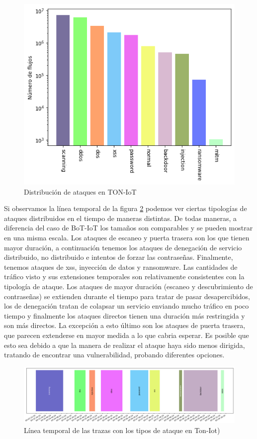 \begin{figure}[H]
  \begin{center}
      \includegraphics[width=0.49\linewidth]{media/toniot_csv_results.png}
  \end{center}
  \captionsetup{justification=centering}
  \caption{Distribución de ataques en TON-IoT}\label{fig:toniot_results}
\end{figure}

Si observamos la línea temporal de la figura \ref{fig:toniot_timeline} podemos ver ciertas tipologías de ataques distribuidos en el tiempo de maneras distintas. De todas maneras, a diferencia del caso de BoT-IoT los tamaños son comparables y se pueden mostrar en una misma escala. Los ataques de escaneo y puerta trasera son los que tienen mayor duración, a continuación tenemos los ataques de denegación de servicio distribuido, no distribuido e intentos de forzar las contraseñas. Finalmente, tenemos ataques de xss, inyección de datos y ransomware. Las cantidades de tráfico visto y sus extensiones temporales son relativamente consistentes con la tipología de ataque. Los ataques de mayor duración (escaneo y descubrimiento de contraseñas) se extienden durante el tiempo para tratar de pasar desapercibidos, los de denegación tratan de colapsar un servicio enviando mucho tráfico en poco tiempo y finalmente los ataques directos tienen una duración más restringida y son más directos. La excepción a esto último son los ataques de puerta trasera, que parecen extenderse en mayor medida a lo que cabria esperar. Es posible que esto sea debido a que la manera de realizar el ataque haya sido menos dirigida, tratando de encontrar una vulnerabilidad, probando diferentes opciones.

\begin{figure}[!htb]
  \begin{center}
      \includegraphics[width=1\linewidth]{media/toniot_csv_timeline.png}
  \end{center}
  \captionsetup{justification=centering}
  \caption{Línea temporal de las trazas con los tipos de ataque en Ton-Iot)}\label{fig:toniot_timeline}
\end{figure}

